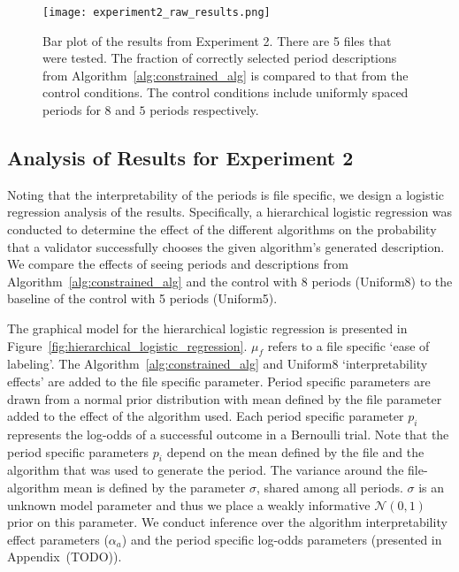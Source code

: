 \begin{figure}
\centering
\texttt{[image: experiment2\_raw\_results.png]}
\caption{Bar plot of the results from Experiment 2. There are 5 files that were tested. The fraction of correctly selected period descriptions from Algorithm~\ref{alg:constrained_alg} is compared to that from the control conditions. The control conditions include uniformly spaced periods for $8$ and $5$ periods respectively.}
\label{fig:experiment2_raw_results}
\end{figure}

\subsection{Analysis of Results for Experiment 2}
Noting that the interpretability of the periods is file specific, we design a logistic regression analysis of the results. Specifically, a hierarchical logistic regression was conducted to determine the effect of the different algorithms on the probability that a validator successfully chooses the given algorithm's generated description. We compare the effects of seeing periods and descriptions from Algorithm~\ref{alg:constrained_alg} and the control with $8$ periods (Uniform8) to the baseline of the control with 5 periods (Uniform5).

The graphical model for the hierarchical logistic regression is presented in Figure~\ref{fig:hierarchical_logistic_regression}. $\mu_f$ refers to a file specific `ease of labeling'. The Algorithm~\ref{alg:constrained_alg} and Uniform8 `interpretability effects' are added to the file specific parameter. Period specific parameters are drawn from a normal prior distribution with mean defined by the file parameter added to the effect of the algorithm used. Each period specific parameter $p_i$ represents the log-odds of a successful outcome in a Bernoulli trial. Note that the period specific parameters $p_i$ depend on the mean defined by the file and the algorithm that was used to generate the period. The variance around the file-algorithm mean is defined by the parameter $\sigma$, shared among all periods. $\sigma$ is an unknown model parameter and thus we place a weakly informative $\mathcal{N}(0,1)$ prior on this parameter. We conduct inference over the algorithm interpretability effect parameters ($\alpha_a$) and the period specific log-odds parameters (presented in Appendix~(TODO)).


